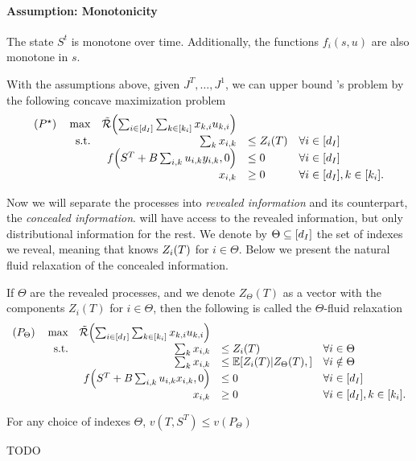 \documentclass[letterpaper,11pt]{article}
\begin{document}
\paragraph{Assumption: Monotonicity}
The state $S^t$ is monotone over time.
Additionally, the functions $f_i(s,u)$ are also monotone in $s$.

\begin{proposition}
With the assumptions above, given $J^T,\ldots,J^1$, we can upper bound \off's problem by the following concave maximization problem
\begin{equation}\label{eq:full_relaxation}
\begin{array}{rrll}
(P^\star)\quad \max  & \tilde \Re\prn*{\sum_{i\in [\dI]}\sum_{k\in [k_i]}x_{k,i}u_{k,i}} \\
\text{s.t.}&  \sum_k x_{i,k} & \leq Z_i(T)  &\forall i\in [\dI] \\
& f\prn*{S^\T+B\sum_{i,k}u_{i,k}y_{i,k},0}&\leq 0 & \forall i\in [\dI] \\
& x_{i,k}&\geq 0 & \forall i\in [\dI], k\in [k_i] .
\end{array}
\end{equation}
\end{proposition}

Now we will separate the processes into \emph{revealed information} and its counterpart, the \emph{concealed information}.
\off will have access to the revealed information, but only distributional information for the rest.
We denote by $\Theta\subseteq [{d_I}]$ the set of indexes we reveal, meaning that \off knows $Z_i(T)$ for $i\in\Theta$.
Below we present the natural fluid relaxation of the concealed information.

\begin{definition}
If $\Theta$ are the revealed processes, and we denote $Z_\Theta(T)$ as a vector with the components $Z_i(T)$ for $i\in\Theta$, then the following is called the $\Theta$-fluid relaxation
\begin{equation}\label{eq:theta_relaxation}
\begin{array}{rrll}
(P_\Theta)\quad \max  & \tilde \Re\prn*{\sum_{i\in [\dI]}\sum_{k\in [k_i]}x_{k,i}u_{k,i}} \\
\text{s.t.}&  \sum_k x_{i,k} & \leq Z_i(T)  &\forall i\in \Theta \\
&  \sum_k x_{i,k} & \leq \E[Z_i(T)| Z_\Theta(T), ]  &\forall i\notin \Theta \\
& f\prn*{S^\T+B\sum_{i,k}u_{i,k}x_{i,k},0}&\leq 0 & \forall i\in [\dI] \\
& x_{i,k}&\geq 0 & \forall i\in [\dI], k\in [k_i] .
\end{array}
\end{equation}
\end{definition}

\begin{proposition}
For any choice of indexes $\Theta$, $v(T,S^T)\leq v(P_\Theta)$	
\end{proposition}

\begin{definition}
	TODO
\end{definition}



\end{document}
